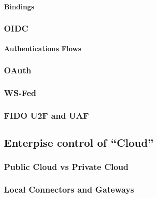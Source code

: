 \hypertarget{bindings}{%
\paragraph{Bindings}\label{bindings}}

\hypertarget{oidc}{%
\subsubsection{OIDC}\label{oidc}}

\hypertarget{authentications-flows}{%
\paragraph{Authentications Flows}\label{authentications-flows}}

\hypertarget{oauth}{%
\subsubsection{OAuth}\label{oauth}}

\hypertarget{ws-fed}{%
\subsubsection{WS-Fed}\label{ws-fed}}

\hypertarget{fido-u2f-and-uaf}{%
\subsubsection{FIDO U2F and UAF}\label{fido-u2f-and-uaf}}

\hypertarget{enterpise-control-of-cloud}{%
\subsection{Enterpise control of
``Cloud''}\label{enterpise-control-of-cloud}}

\hypertarget{public-cloud-vs-private-cloud}{%
\subsubsection{Public Cloud vs Private
Cloud}\label{public-cloud-vs-private-cloud}}

\hypertarget{local-connectors-and-gateways}{%
\subsubsection{Local Connectors and
Gateways}\label{local-connectors-and-gateways}}

